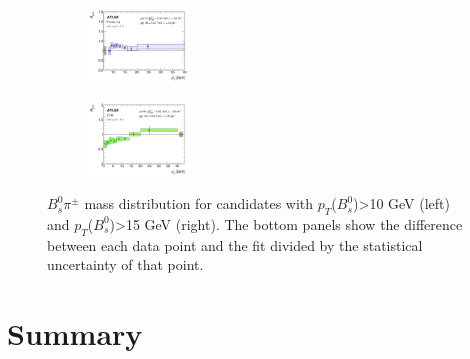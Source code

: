 \documentclass[epj]{webofc}
\begin{document}
\begin{figure}
    \centering
    \begin{subfigure}[H]{0.45\textwidth}
        \includegraphics[width=0.3\textwidth, natwidth=610,natheight=500]{plots/production/fig_10a.png}
    \end{subfigure}
    \begin{subfigure}[H]{0.45\textwidth}
        \includegraphics[width=0.3\textwidth, natwidth=610,natheight=500]{plots/production/fig_12a.png}
    \end{subfigure}
    \caption{$B_{s}^{0}\pi^{\pm}$ mass distribution for candidates with $p_T$($B_{s}^{0}$)>10 GeV (left) and $p_T$($B_{s}^{0}$)>15 GeV (right). 
     The bottom panels show the difference between each data point and the fit divided by the statistical uncertainty of that point.}
    \label{fig:production}
\end{figure}

\section{Summary}
\label{sum}
\end{document}
